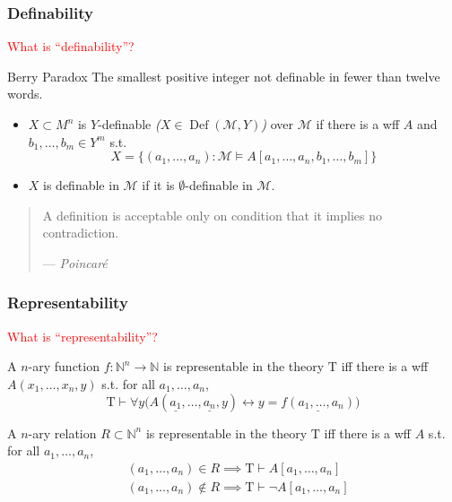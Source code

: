 \documentclass[UTF8,aspectratio=43,11pt,colorlinks,compress,openany]{beamer}%
\begin{document}
\begin{frame}\frametitle{Definability}
\begin{block}{}
	\begin{center}
		\textcolor{red}{What is ``definability''?}
	\end{center}
\end{block}
\begin{block}{Berry Paradox}
	The smallest positive integer not definable in fewer than twelve words.
\end{block}
\begin{definition}[Definability]
\begin{itemize}
	\item $X\subset M^n$ is $Y$-definable \emph{($X\in\operatorname{Def}(\mathcal{M},Y)$)} over $\mathcal{M}$ if there is a wff $A$ and $b_1,\dots,b_m\in Y^m$ s.t.
	\[X=\big\{(a_1,\dots,a_n): \mathcal{M}\vDash A[a_1,\dots,a_n,b_1,\dots,b_m]\big\}\]
	\item $X$ is definable in $\mathcal{M}$ if it is $\emptyset$-definable in $\mathcal{M}$.
\end{itemize}
\end{definition}
\begin{quote}
	A definition is acceptable only on condition that it implies no contradiction.\par\hfill --- \textsl{Poincar\'e}
\end{quote}
\end{frame}

\begin{frame}\frametitle{Representability}
	\begin{block}{}
		\begin{center}
			\textcolor{red}{What is ``representability''?}
		\end{center}
	\end{block}
	\begin{definition}
		A $n$-ary function $f:\mathbb{N}^n\to\mathbb{N}$ is representable in the theory $\mathrm{T}$ iff there is a wff $A(x_1,\dots,x_n,y)$ s.t. for all $a_1,\dots,a_n$,
	\setlength\belowdisplayskip{0pt}
		\[\mathrm{T}\vdash\forall y\Big(A(\underline{a_1},\dots,\underline{a_n},y)\leftrightarrow y=\underline{f(a_1,\dots,a_n)}\Big)\]
	\end{definition}
	\begin{definition}
		A $n$-ary relation $R\subset\mathbb{N}^n$ is representable in the theory $\mathrm{T}$ iff there is a wff $A$ s.t. for all $a_1,\dots,a_n$,
	\setlength\abovedisplayskip{0pt}
	\setlength\belowdisplayskip{0pt}
		\begin{align*}
		&(a_1,\dots,a_n)\in R\implies \mathrm{T}\vdash A[a_1,\dots,a_n]\\
		&(a_1,\dots,a_n)\notin R\implies \mathrm{T}\vdash\neg A[a_1,\dots,a_n]
		\end{align*}
	\end{definition}
	\centering{}
\end{frame}
\end{document}
